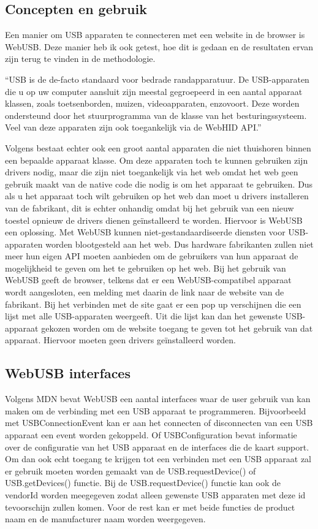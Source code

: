 \subsection{Concepten en gebruik}
Een manier om USB apparaten te connecteren met een website in de browser is WebUSB. Deze manier heb ik ook getest, hoe dit is gedaan en de resultaten ervan zijn terug te vinden in de methodologie.

``USB is de de-facto standaard voor bedrade randapparatuur. De USB-apparaten die u op uw computer aansluit zijn meestal gegroepeerd in een aantal apparaat klassen, zoals toetsenborden, muizen, videoapparaten, enzovoort. Deze worden ondersteund door het stuurprogramma van de klasse van het besturingssysteem. Veel van deze apparaten zijn ook toegankelijk via de WebHID API.''\autocite{DevMozWebUSB}

Volgens \textcite{DevMozWebUSB} bestaat echter ook een groot aantal apparaten die niet thuishoren binnen een bepaalde apparaat klasse. Om deze apparaten toch te kunnen gebruiken zijn drivers nodig, maar die zijn niet toegankelijk via het web omdat het web geen gebruik maakt van de native code die nodig is om het apparaat te gebruiken. Dus als u het apparaat toch wilt gebruiken op het web dan moet u drivers installeren van de fabrikant, dit is echter onhandig omdat bij het gebruik van een nieuw toestel opnieuw de drivers dienen geïnstalleerd te worden. 
Hiervoor is WebUSB een oplossing. Met WebUSB kunnen niet-gestandaardiseerde diensten voor USB-apparaten worden blootgesteld aan het web. Dus hardware fabrikanten zullen niet meer hun eigen API moeten aanbieden om de gebruikers van hun apparaat de mogelijkheid te geven om het te gebruiken op het web. 
Bij het gebruik van WebUSB geeft de browser, telkens dat er een WebUSB-compatibel apparaat wordt aangesloten, een melding met daarin de link naar de website van de fabrikant. Bij het verbinden met de site gaat er een pop up verschijnen die een lijst met alle USB-apparaten weergeeft. Uit die lijst kan dan het gewenste USB-apparaat gekozen worden om de website toegang te geven tot het gebruik van dat apparaat. Hiervoor moeten geen drivers geïnstalleerd worden. 

\subsection{WebUSB interfaces}
Volgens MDN \textcite{DevMozWebUSB} bevat WebUSB een aantal interfaces waar de user gebruik van kan maken om de verbinding met een USB apparaat te programmeren. Bijvoorbeeld met USBConnectionEvent kan er aan het connecten of disconnecten van een USB apparaat een event worden gekoppeld. Of USBConfiguration bevat informatie over de configuratie van het USB apparaat en de interfaces die de kaart support.
Om dan ook echt toegang te krijgen tot een verbinden met een USB apparaat zal er gebruik moeten worden gemaakt van de USB.requestDevice() of USB.getDevices()  functie. Bij de USB.requestDevice() functie kan ook de vendorId worden meegegeven zodat alleen gewenste USB apparaten met deze id tevoorschijn zullen komen. Voor de rest kan er met beide functies de product naam en de manufacturer naam worden weergegeven.





